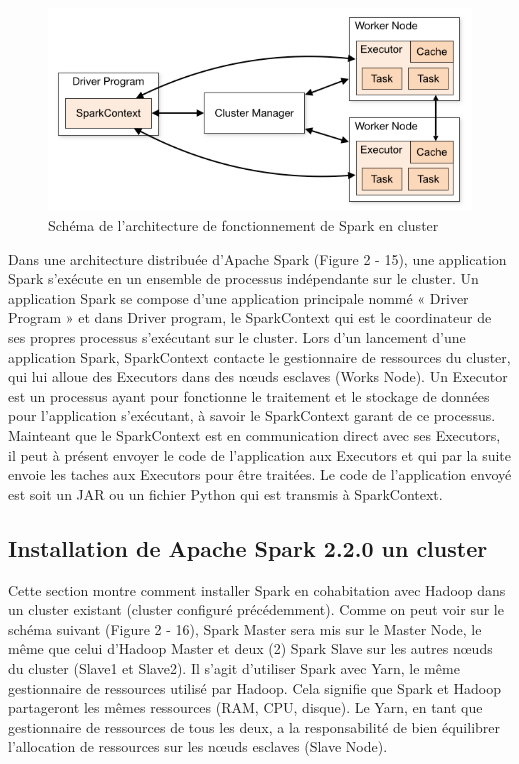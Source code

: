 \documentclass[12pt,french]{book}
\begin{document}
\begin{figure}[h]
	\centering
	\includegraphics[width=\linewidth]{sparkArch}
	\caption[Schéma de l'architecture de fonctionnement de Spark en cluster]{Schéma de l'architecture de fonctionnement de Spark en cluster \footnotemark}
\end{figure}


Dans une architecture distribuée d’Apache Spark (Figure 2 - 15), une application Spark s’exécute en un ensemble de processus indépendante sur le cluster.
Un application Spark se compose d’une application principale nommé « Driver Program » et dans Driver program, le SparkContext qui est le coordinateur de ses propres processus s’exécutant sur le cluster.
Lors d’un lancement d’une application Spark, SparkContext contacte le gestionnaire de ressources du cluster, qui lui alloue des Executors dans des nœuds esclaves (Works Node).
Un Executor est un processus ayant pour fonctionne le traitement et le stockage de données pour l’application s’exécutant, à savoir le SparkContext garant de ce processus.
Mainteant que le SparkContext est en communication direct avec ses Executors, il peut à présent envoyer le code de l’application aux Executors et qui par la suite envoie les taches aux Executors pour être traitées.
Le code de l’application envoyé est soit un JAR ou un fichier Python qui est transmis à SparkContext.


\subsection{Installation de Apache Spark 2.2.0 un cluster}

Cette section montre comment installer Spark en cohabitation avec Hadoop dans un cluster existant (cluster configuré précédemment).
Comme on peut voir sur le schéma suivant (Figure 2 - 16), Spark Master sera mis sur le Master Node, le même que celui d’Hadoop Master et deux (2) Spark Slave sur les autres nœuds du cluster (Slave1 et Slave2).
Il s'agit d'utiliser Spark avec Yarn, le même gestionnaire de ressources utilisé par Hadoop.
Cela signifie que Spark et Hadoop partageront les mêmes ressources (RAM, CPU, disque). Le Yarn, en tant que gestionnaire de ressources de tous les deux, a la responsabilité de bien équilibrer l'allocation de ressources sur les nœuds esclaves (Slave Node).
\end{document}
